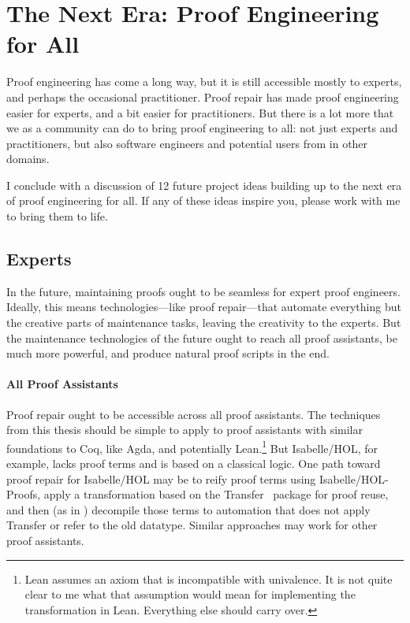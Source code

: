 \section*{The Next Era: Proof Engineering for All}


Proof engineering has come a long way, but it is still accessible mostly to experts, and perhaps the occasional practitioner.
Proof repair has made proof engineering easier for experts, and a bit easier for practitioners.
But there is a lot more that we as a community can do to bring proof engineering to all: not just experts and practitioners,
but also software engineers and potential users from in other domains.

I conclude with a discussion of 12 future project ideas building up to the next era of proof engineering for all.
If any of these ideas inspire you, please work with me to bring them to life.

\subsection*{Experts}

In the future, maintaining proofs ought to be seamless for expert proof engineers.
Ideally, this means technologies---like proof repair---that automate everything but the creative parts of maintenance tasks,
leaving the creativity to the experts.
But the maintenance technologies of the future ought to reach all proof assistants,
be much more powerful,
and produce natural proof scripts in the end.

\paragraph{All Proof Assistants}
Proof repair ought to be accessible across all proof assistants.
The techniques from this thesis should be simple to apply to proof assistants with similar foundations to Coq, like Agda,
and potentially Lean.\footnote{Lean assumes an axiom that is incompatible with univalence.
It is not quite clear to me what that assumption would mean for implementing the \toolnamec transformation in Lean.
Everything else should carry over.}
But Isabelle/HOL, for example, lacks proof terms and is based on a classical logic.
One path toward proof repair for Isabelle/HOL may be to reify proof terms using
Isabelle/HOL-Proofs, apply a transformation based on the Transfer~\cite{Huffman2013} package for proof reuse, and then (as in \toolnamec) decompile those terms to automation that does 
not apply Transfer or refer to the old datatype.
Similar approaches may work for other proof assistants.

